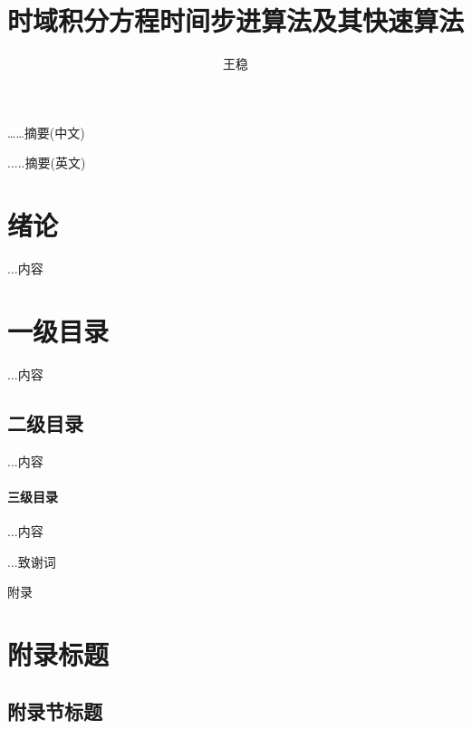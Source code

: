 \documentclass[bachelor]{thesis-uestc}
\title{时域积分方程时间步进算法及其快速算法}{The Time Marching Scheme of Time Domain Integral Equation and Corresponding Fast Algorithm}
\author{王稳}{Wang Wen}                       %
\begin{document}
\makecover

\begin{chineseabstract}
……摘要(中文)

\end{chineseabstract}

\begin{englishabstract}
.....摘要(英文)

\end{englishabstract}

\thesistableofcontents

\chapter{绪\hspace{6pt}论}  %
...内容

\chapter{一级目录}  %
...内容

\section{二级目录}  %
...内容

\subsubsection{三级目录}  %
...内容

\thesisacknowledgement
...致谢词

\thesisappendix
附录

\chapter{附录标题}  %

\section{附录节标题}  %
\end{document}
